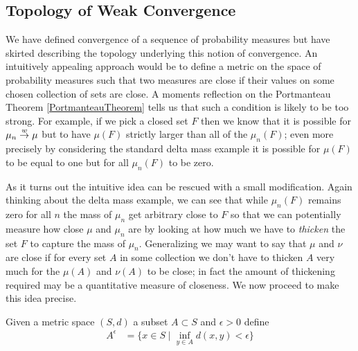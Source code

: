 \subsection{Topology of Weak Convergence}
We have defined convergence of a sequence of probability measures but
have skirted describing the topology underlying this notion of
convergence. An intuitively appealing approach would be to define a
metric on the space of probability measures such that two measures are
close if their values on some chosen collection of sets are close.  A
moments reflection on the Portmanteau Theorem \ref{PortmanteauTheorem}
tells us that such a condition is likely to be too strong.  For
example, if we pick a closed set $F$ then we know that it is possible
for $\mu_n \overset{w}\to \mu$ but to have $\mu(F)$ strictly larger than all
of the $\mu_n(F)$; even more precisely by considering the standard
delta mass example it is possible for $\mu(F)$ to be equal to one but
for all $\mu_n(F)$ to be zero.  

As it turns out the intuitive idea can be rescued with a small
modification.  Again thinking about the delta mass example, we can see
that while $\mu_n(F)$ remains zero for all $n$ the mass of $\mu_n$ get
arbitrary close to $F$ so that we can potentially measure how close
$\mu$ and $\mu_n$ are by looking at how much we have to \emph{thicken}
the set $F$ to capture the mass of $\mu_n$.  Generalizing we may want
to say that $\mu$ and $\nu$ are close if for every set $A$ in some
collection we don't have to thicken $A$ very much for the $\mu(A)$ and
$\nu(A)$ to be close; in fact the amount of thickening required may be a
quantitative measure of closeness.  We now proceed to make this idea precise.

\begin{defn}Given a metric space $(S,d)$ a subset $A \subset S$ and
$\epsilon > 0$ define
\begin{align*}
A^\epsilon &= \lbrace x \in S \mid \inf_{y \in A} d(x,y) < \epsilon \rbrace
\end{align*}
\end{defn} 

